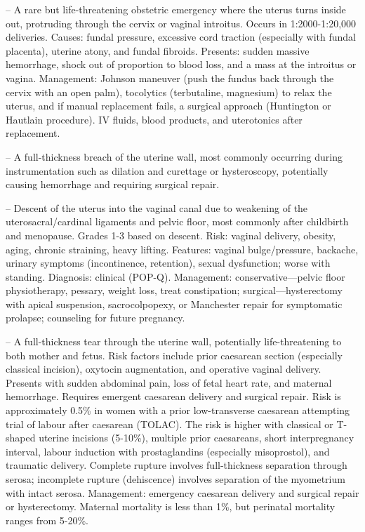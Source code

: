 -- A rare but life-threatening obstetric emergency where the uterus turns inside out, protruding through the cervix or vaginal introitus. Occurs in 1:2000-1:20,000 deliveries. Causes: fundal pressure, excessive cord traction (especially with fundal placenta), uterine atony, and fundal fibroids. Presents: sudden massive hemorrhage, shock out of proportion to blood loss, and a mass at the introitus or vagina. Management: Johnson maneuver (push the fundus back through the cervix with an open palm), tocolytics (terbutaline, magnesium) to relax the uterus, and if manual replacement fails, a surgical approach (Huntington or Hautlain procedure). IV fluids, blood products, and uterotonics after replacement.

-- A full-thickness breach of the uterine wall, most commonly occurring during instrumentation such as dilation and curettage or hysteroscopy, potentially causing hemorrhage and requiring surgical repair.

-- Descent of the uterus into the vaginal canal due to weakening of the uterosacral/cardinal ligaments and pelvic floor, most commonly after childbirth and menopause. Grades 1-3 based on descent. Risk: vaginal delivery, obesity, aging, chronic straining, heavy lifting. Features: vaginal bulge/pressure, backache, urinary symptoms (incontinence, retention), sexual dysfunction; worse with standing. Diagnosis: clinical (POP-Q). Management: conservative—pelvic floor physiotherapy, pessary, weight loss, treat constipation; surgical—hysterectomy with apical suspension, sacrocolpopexy, or Manchester repair for symptomatic prolapse; counseling for future pregnancy.

-- A full-thickness tear through the uterine wall, potentially life-threatening to both mother and fetus. Risk factors include prior caesarean section (especially classical incision), oxytocin augmentation, and operative vaginal delivery. Presents with sudden abdominal pain, loss of fetal heart rate, and maternal hemorrhage. Requires emergent caesarean delivery and surgical repair. Risk is approximately 0.5\% in women with a prior low-transverse caesarean attempting trial of labour after caesarean (TOLAC). The risk is higher with classical or T-shaped uterine incisions (5-10\%), multiple prior caesareans, short interpregnancy interval, labour induction with prostaglandins (especially misoprostol), and traumatic delivery. Complete rupture involves full-thickness separation through serosa; incomplete rupture (dehiscence) involves separation of the myometrium with intact serosa. Management: emergency caesarean delivery and surgical repair or hysterectomy. Maternal mortality is less than 1\%, but perinatal mortality ranges from 5-20\%.

